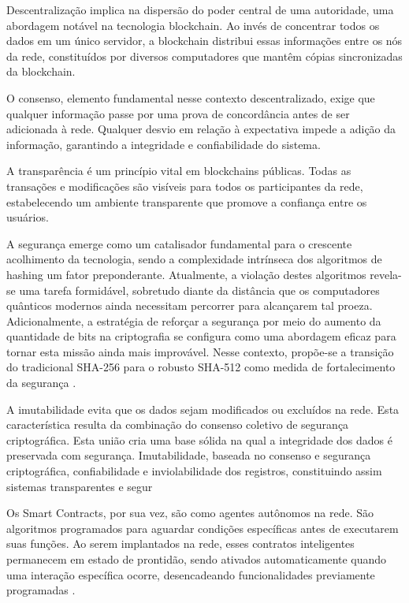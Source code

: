 Descentralização implica na dispersão do poder central de uma autoridade, uma abordagem notável na tecnologia blockchain. Ao invés de concentrar todos os dados em um único servidor, a blockchain distribui essas informações entre os nós da rede, constituídos por diversos computadores que mantêm cópias sincronizadas da blockchain.

O consenso, elemento fundamental nesse contexto descentralizado, exige que qualquer informação passe por uma prova de concordância antes de ser adicionada à rede. Qualquer desvio em relação à expectativa impede a adição da informação, garantindo a integridade e confiabilidade do sistema.

A transparência é um princípio vital em blockchains públicas. Todas as transações e modificações são visíveis para todos os participantes da rede, estabelecendo um ambiente transparente que promove a confiança entre os usuários.

A segurança emerge como um catalisador fundamental para o crescente acolhimento da tecnologia, sendo a complexidade intrínseca dos algoritmos de hashing um fator preponderante. Atualmente, a violação destes algoritmos revela-se uma tarefa formidável, sobretudo diante da distância que os computadores quânticos modernos ainda necessitam percorrer para alcançarem tal proeza. Adicionalmente, a estratégia de reforçar a segurança por meio do aumento da quantidade de bits na criptografia se configura como uma abordagem eficaz para tornar esta missão ainda mais improvável.
Nesse contexto, propõe-se a transição do tradicional SHA-256 para o robusto SHA-512 como medida de fortalecimento da segurança \cite{Cointelegraph}.

A imutabilidade evita que os dados sejam modificados ou excluídos na rede.   
Esta característica resulta da combinação  do consenso coletivo de segurança criptográfica. 
Esta união cria uma base sólida  na qual a integridade dos dados é preservada com segurança.  
Imutabilidade, baseada no consenso  e segurança criptográfica, confiabilidade e inviolabilidade dos registros, constituindo assim  sistemas transparentes e segur

Os Smart Contracts, por sua vez, são como agentes autônomos na rede. São algoritmos programados para aguardar condições específicas antes de executarem suas funções. Ao serem implantados na rede, esses contratos inteligentes permanecem em estado de prontidão, sendo ativados automaticamente quando uma interação específica ocorre, desencadeando funcionalidades previamente programadas \cite{InfoMoney}.

